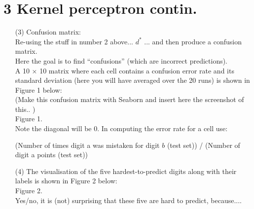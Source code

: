 \documentclass[a4paper,12pt]{article}
\begin{document}
\section*{3 Kernel perceptron contin.}
\begin{enumerate}

\item[(3)]
Confusion matrix: \\
Re-using the stuff in number 2 above... $d^*$ ... and then produce a confusion matrix. \\
Here the goal is to find “confusions” (which are incorrect predictions). \\
A 10 × 10 matrix where each cell contains a confusion error rate and its standard deviation (here you will have averaged over the 20 runs) is shown in Figure 1 below:\\
(Make this confusion matrix with Seaborn and insert here the screenshot of this.. )\\
Figure 1. \\
Note the diagonal will be 0. In computing the error rate for a cell use:

(Number of times digit a was mistaken for digit $b$ (test set)) / (Number of digit a points (test set))

\item[(4)]
The visualisation of the five hardest-to-predict digits along with their labels is shown in Figure 2 below: \\
Figure 2.\\
Yes/no, it is (not) surprising that these five are hard to predict, because.... 

\end{enumerate}
\clearpage
\end{document}
